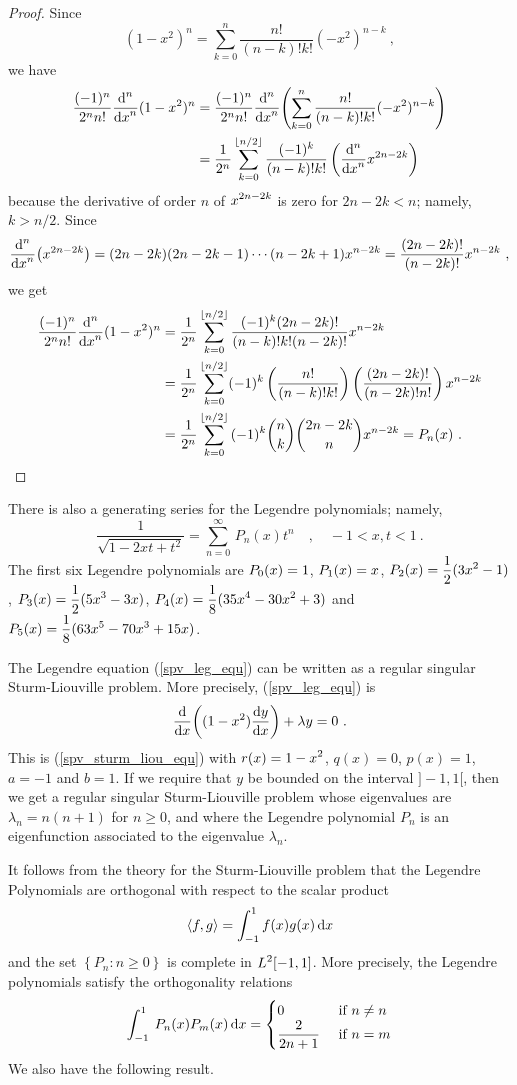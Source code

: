 \begin{proof}
Since
\[
(1-x^2)^n = \sum_{k=0}^n \frac{n!}{(n-k)!k!} (-x^2)^{n-k} \ ,
\]
we have
\begin{align*}
\frac{(-1)^n}{2^n n!} \dfdxn{(1-x^2)^n}{x}{n}
&= \frac{(-1)^n}{2^n n!}
\dfdxn{ \left( \sum_{k=0}^n \frac{n!}{(n-k)!k!} (-x^2)^{n-k} \right)}{x}{n} \\
&= \frac{1}{2^n}\sum_{k=0}^{\intpt{n/2}} \frac{(-1)^k}{(n-k)!k!}
\left( \dfdxn{x^{2n-2k}}{x}{n} \right)
\end{align*}
because the derivative of order $n$ of $\DS x^{2n-2k}$ is zero for 
$2n-2k<n$; namely, $k > n/2$.  Since
\[
\dfdxn{\left(x^{2n-2k}\right)}{x}{n} =
(2n-2k)(2n-2k-1) \cdots (n-2k+1) x^{n-2k}
= \frac{(2n-2k)!}{(n-2k)!} x^{n-2k} \ ,
\]
we get
\begin{align*}
\frac{(-1)^n}{2^n n!} \dfdxn{(1-x^2)^n}{x}{n}
&= \frac{1}{2^n}\sum_{k=0}^{\intpt{n/2}} \frac{(-1)^k (2n-2k)!}{(n-k)!k!(n-2k)!}
x^{n-2k} \\
&= \frac{1}{2^n}\sum_{k=0}^{\intpt{n/2}} (-1)^k
\left(\frac{n!}{(n-k)!k!}\right)
\left(\frac{(2n-2k)!}{(n-2k)!n!}\right) x^{n-2k} \\
&= \frac{1}{2^n} \sum_{k=0}^{\intpt{n/2}} \, (-1)^k \binom{n}{k}
\binom{2n-2k}{n} x^{n-2k} = P_n(x) \ .  \qedhere
\end{align*}
\end{proof}

There is also a generating series for the Legendre polynomials;
namely,
\[
\frac{1}{\sqrt{1-2xt +t^2}} = \sum_{n=0}^{\infty} \, P_n(x) t^n \quad ,
\quad -1 < x,t < 1 \ .
\]
The first six Legendre polynomials are
$\DS P_0(x) = 1$, $\DS P_1(x) = x$,
$\DS P_2(x) = \frac{1}{2}(3x^2-1)$,
$\DS P_3(x) = \frac{1}{2} (5x^3 - 3 x)$,
$\DS P_4(x) = \frac{1}{8}(35x^4 - 30x^2 + 3)$ and
$\DS P_5(x) = \frac{1}{8} (63x^5 -70x^3 + 15x)$.

The Legendre equation (\ref{spv_leg_equ}) can be written as a regular
singular Sturm-Liouville problem.  More precisely, (\ref{spv_leg_equ}) is 
\[
\dfdx{ \left( (1-x^2) \dydx{y}{x}\right)}{x} + \lambda y = 0 \ .
\]
This is (\ref{spv_sturm_liou_equ}) with
$\DS r(x) = 1 -x^2$, $q(x)=0$,
$p(x) =1$, $a=-1$ and $b=1$.  If we require that $y$ be bounded on the
interval $]-1,1[$, then we get a regular singular Sturm-Liouville problem
whose eigenvalues are $\lambda_n = n(n+1)$ for $n \geq 0$, and where
the Legendre polynomial $P_n$ is an eigenfunction associated to the
eigenvalue $\lambda_n$.

It follows from the theory for the Sturm-Liouville problem that the
Legendre Polynomials are orthogonal with respect to the scalar product
\[
\ps{f}{g} = \int_{-1}^1 f(x)g(x) \dx{x}
\]
and the set $\left\{ P_n : n \geq 0\right\}$ is complete in
$\DS L^2[-1,1]$.  More precisely, the Legendre polynomials
satisfy the orthogonality relations
\[
\int_{-1}^{1} \: P_n(x) P_m(x) \dx{x} =
\begin{cases}
0 & \mbox{ if } n \neq n \\
\DS \frac{2}{2n+1} & \mbox{ if } n = m
\end{cases}
\]
We also have the following result.

